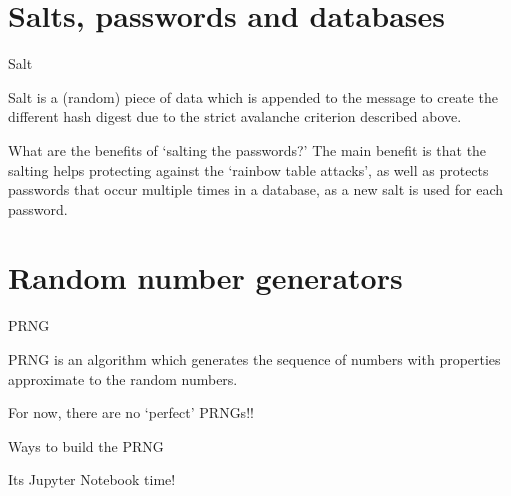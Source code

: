 \documentclass{beamer}
\begin{document}
\section{Salts, passwords and databases}

\begin{frame}{Salt}
    \begin{definition}
        Salt is a (random) piece of data which is appended to the message to 
        create the different hash digest due to the strict avalanche criterion
        described above.
    \end{definition}
    \pause
    What are the benefits of `salting the passwords?'
    \pause
    The main benefit is that the salting helps protecting against the `rainbow
    table attacks', as well as protects passwords that occur multiple times in 
    a database, as a new salt is used for each password. 
\end{frame}

\section{Random number generators}

\begin{frame}{PRNG}
    \begin{definition}
        \pause
        PRNG is an algorithm which generates the sequence of numbers with 
        properties approximate to the random numbers.
    \end{definition}
    \pause
    For now, there are no `perfect' PRNGs!!
\end{frame}

\begin{frame}{Ways to build the PRNG}
    
\end{frame}

\begin{frame}
    Its Jupyter Notebook time!
\end{frame}

% 	
% 	
\end{document}
